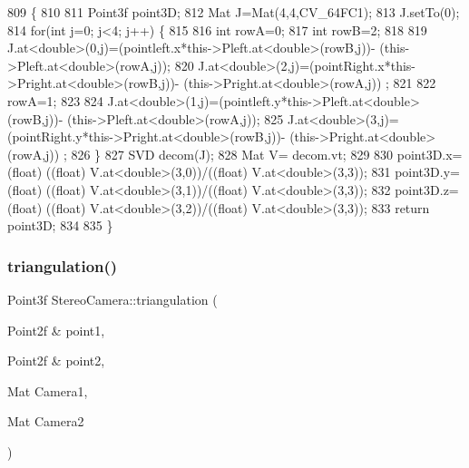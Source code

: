 \begin{DoxyCode}
809                                                                            \{
810 
811     Point3f point3D;
812     Mat J=Mat(4,4,CV\_64FC1);
813     J.setTo(0);
814     \textcolor{keywordflow}{for}(\textcolor{keywordtype}{int} j=0; j<4; j++) \{
815 
816         \textcolor{keywordtype}{int} rowA=0;
817         \textcolor{keywordtype}{int} rowB=2;
818 
819         J.at<\textcolor{keywordtype}{double}>(0,j)=(pointleft.x*this->Pleft.at<\textcolor{keywordtype}{double}>(rowB,j))- (this->Pleft.at<\textcolor{keywordtype}{double}>(rowA,j));
820         J.at<\textcolor{keywordtype}{double}>(2,j)=(pointRight.x*this->Pright.at<\textcolor{keywordtype}{double}>(rowB,j))- (this->Pright.at<\textcolor{keywordtype}{double}>(rowA,j))
      ;
821 
822         rowA=1;
823 
824         J.at<\textcolor{keywordtype}{double}>(1,j)=(pointleft.y*this->Pleft.at<\textcolor{keywordtype}{double}>(rowB,j))- (this->Pleft.at<\textcolor{keywordtype}{double}>(rowA,j));
825         J.at<\textcolor{keywordtype}{double}>(3,j)=(pointRight.y*this->Pright.at<\textcolor{keywordtype}{double}>(rowB,j))- (this->Pright.at<\textcolor{keywordtype}{double}>(rowA,j))
      ;
826     \}
827     SVD decom(J);
828     Mat V= decom.vt;
829 
830     point3D.x=(float) ((\textcolor{keywordtype}{float}) V.at<\textcolor{keywordtype}{double}>(3,0))/((float) V.at<\textcolor{keywordtype}{double}>(3,3));
831     point3D.y=(float) ((\textcolor{keywordtype}{float}) V.at<\textcolor{keywordtype}{double}>(3,1))/((float) V.at<\textcolor{keywordtype}{double}>(3,3));
832     point3D.z=(float) ((\textcolor{keywordtype}{float}) V.at<\textcolor{keywordtype}{double}>(3,2))/((float) V.at<\textcolor{keywordtype}{double}>(3,3));
833     \textcolor{keywordflow}{return} point3D;
834 
835 \}
\end{DoxyCode}
\mbox{\label{classStereoCamera_ab68c8d3bd07f542243d681fbe8c8c6b7}} 
\subsubsection{\texorpdfstring{triangulation()}{triangulation()}\hspace{0.1cm}{\footnotesize\ttfamily [2/2]}}
{\footnotesize\ttfamily Point3f Stereo\+Camera\+::triangulation (\begin{DoxyParamCaption}\item[{Point2f \&}]{point1,  }\item[{Point2f \&}]{point2,  }\item[{Mat}]{Camera1,  }\item[{Mat}]{Camera2 }\end{DoxyParamCaption})}



